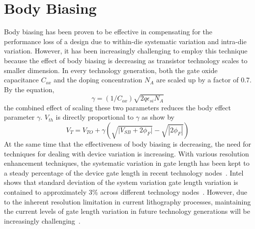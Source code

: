 \section{Body Biasing}
\label{sec:bodybiasing}

Body biasing has been proven to be effective in compensating for the performance loss of a design due to within-die systematic variation and intra-die variation.
However, it has been increasingly challenging to employ this technique because the effect of body biasing is decreasing as transistor technology scales to smaller dimension.
In every technology generation, both the gate oxide capacitance $C_{ox}$ and the doping concentration $N_A$ are scaled up by a factor of 0.7.
By the equation,
\begin{equation}
\gamma = (1/C_{ox})\sqrt{2q\epsilon_{si}N_A}
\end{equation}
the combined effect of scaling these two parameters reduces the body effect parameter $\gamma$. $V_{th}$ is directly proportional to $\gamma$ as show by
\begin{equation}
V_{T} = V_{TO} + \gamma ( \sqrt{ | {V_{SB} + 2\phi_{F} | } } - \sqrt{ | 2\phi_{F} | } )
\end{equation}
At the same time that the effectiveness of body biasing is decreasing, the need for techniques for dealing with device variation is increasing.
With various resolution enhancement techniques, the systematic variation in gate length has been kept to a steady percentage of the device gate length in recent technology nodes~\cite{Intel:2009}.
Intel shows that standard deviation of the system variation gate length variation is contained to approximately 3\% across different technology nodes~\cite{Intel:2009}.
However, due to the inherent resolution limitation in current lithography processes, maintaining the current levels of gate length variation in future technology generations will be increasingly challenging~\cite{OPC20}.
   
